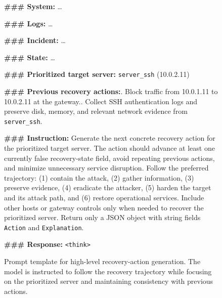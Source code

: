 \documentclass[sigconf]{acmart}
\begin{document}
\begin{figure}
\centering
\begin{tcolorbox}[
  title=Recovery-Action Generation Prompt Template,
  colback=teal!5,
  colframe=teal!60,
  boxrule=0.5pt,
  arc=2pt,
  left=5pt,
  right=5pt,
  top=5pt,
  bottom=5pt]
\footnotesize
\textbf{\#\#\# System:} \ldots

\textbf{\#\#\# Logs:} \ldots

\textbf{\#\#\# Incident:} \ldots

\textbf{\#\#\# State:} \ldots

\textbf{\#\#\# Prioritized target server:}
\texttt{server\_ssh} (10.0.2.11)

\textbf{\#\#\# Previous recovery actions:}. Block traffic from 10.0.1.11 to 10.0.2.11 at the gateway.. Collect SSH authentication logs and preserve disk, memory, and relevant network evidence from \texttt{server\_ssh}. 

\textbf{\#\#\# Instruction:}
Generate the next concrete recovery action for the prioritized target server.
The action should advance at least one currently false recovery-state field,
avoid repeating previous actions, and minimize unnecessary service disruption.
Follow the preferred trajectory: (1) contain the attack, (2) gather information,
(3) preserve evidence, (4) eradicate the attacker, (5) harden the target and
its attack path, and (6) restore operational services. Include other hosts or
gateway controls only when needed to recover the prioritized server. Return
only a JSON object with string fields \texttt{Action} and
\texttt{Explanation}.

\textbf{\#\#\# Response:}
\texttt{<think>}
\end{tcolorbox}
\caption{Prompt template for high-level recovery-action generation. The model
is instructed to follow the recovery trajectory while focusing on the
prioritized server and maintaining consistency with previous actions.}
\label{fig:action-prompt}
\end{figure}
\end{document}
